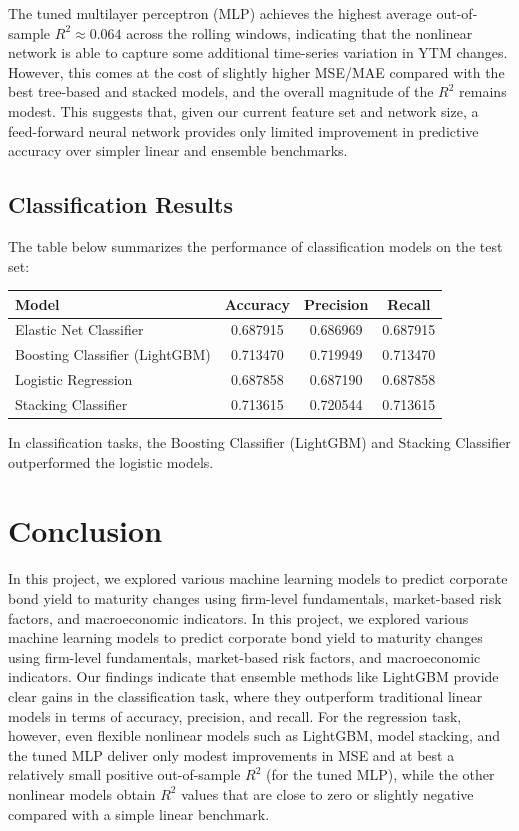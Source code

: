 \documentclass[12pt]{article}
\begin{document}
The tuned multilayer perceptron (MLP) achieves the highest average out-of-sample $R^2 \approx 0.064$ across the rolling windows, indicating that the nonlinear network is able to capture some additional time-series variation in YTM changes. However, this comes at the cost of slightly higher MSE/MAE compared with the best tree-based and stacked models, and the overall magnitude of the $R^2$ remains modest. This suggests that, given our current feature set and network size, a feed-forward neural network provides only limited improvement in predictive accuracy over simpler linear and ensemble benchmarks.

\subsection{Classification Results}

The table below summarizes the performance of classification models on the test set:

\begin{singlespace}
\begin{table}[H]
\centering
\begin{tabular}{lccc}
\toprule
\textbf{Model} & \textbf{Accuracy} & \textbf{Precision} & \textbf{Recall} \\
\midrule
Elastic Net Classifier & 0.687915 & 0.686969 & 0.687915 \\
Boosting Classifier (LightGBM) & 0.713470 & 0.719949 & 0.713470 \\
Logistic Regression & 0.687858 & 0.687190 & 0.687858 \\
Stacking Classifier & 0.713615 & 0.720544 & 0.713615 \\
\bottomrule
\end{tabular}
\end{table}
\end{singlespace}

In classification tasks, the Boosting Classifier (LightGBM) and Stacking Classifier outperformed the logistic models.

\section{Conclusion}

In this project, we explored various machine learning models to predict corporate bond yield to maturity changes using firm-level fundamentals, market-based risk factors, and macroeconomic indicators. In this project, we explored various machine learning models to predict corporate bond yield to maturity changes using firm-level fundamentals, market-based risk factors, and macroeconomic indicators. Our findings indicate that ensemble methods like LightGBM provide clear gains in the classification task, where they outperform traditional linear models in terms of accuracy, precision, and recall. For the regression task, however, even flexible nonlinear models such as LightGBM, model stacking, and the tuned MLP deliver only modest improvements in MSE and at best a relatively small positive out-of-sample $R^2$ (for the tuned MLP), while the other nonlinear models obtain $R^2$ values that are close to zero or slightly negative compared with a simple linear benchmark.
\end{document}

